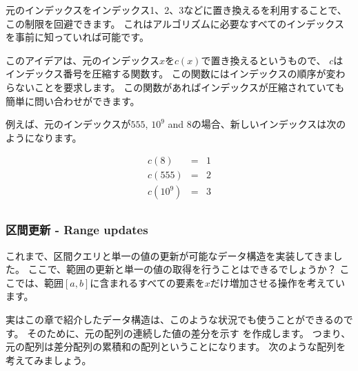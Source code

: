 
元のインデックスをインデックス1、2、3などに置き換えるを利用することで、
この制限を回避できます。
これはアルゴリズムに必要なすべてのインデックスを事前に知っていれば可能です。

このアイデアは、元のインデックス$x$を$c(x)$で置き換えるというもので、
$c$は インデックス番号を圧縮する関数す。
この関数にはインデックスの順序が変わらないことを要求します。
この関数があればインデックスが圧縮されていても簡単に問い合わせができます。

例えば、元のインデックスが$555$, $10^9$ and $8$の場合、新しいインデックスは次のようになります。

\[
\begin{array}{lcl}
c(8) & = & 1 \\
c(555) & = & 2 \\
c(10^9) & = & 3 \\
\end{array}
\]

\subsubsection{区間更新 - Range updates}

これまで、区間クエリと単一の値の更新が可能なデータ構造を実装してきました。
ここで、範囲の更新と単一の値の取得を行うことはできるでしょうか？
ここでは、範囲$[a, b]$に含まれるすべての要素を$x$だけ増加させる操作を考えています。


実はこの章で紹介したデータ構造は、このような状況でも使うことができるのです。
そのために、元の配列の連続した値の差分を示す
を作成します。
つまり、元の配列は差分配列の累積和の配列ということになります。
次のような配列を考えてみましょう。

\begin{center}
\end{center}

